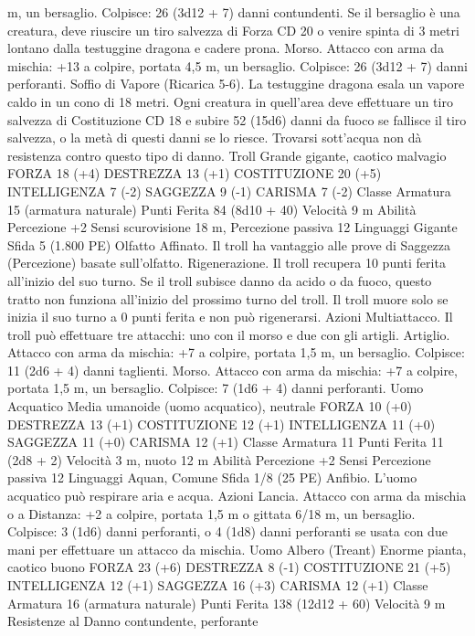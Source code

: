 \begin{multicols}{2}
m, un bersaglio.
Colpisce: 26 (3d12 + 7) danni contundenti. Se il bersaglio è una
creatura, deve riuscire un tiro salvezza di Forza CD 20 o venire
spinta di 3 metri lontano dalla testuggine dragona e cadere prona.
Morso. Attacco con arma da mischia: +13 a colpire, portata 4,5
m, un bersaglio.
Colpisce: 26 (3d12 + 7) danni perforanti.
Soffio di Vapore (Ricarica 5-6). La testuggine dragona esala un
vapore caldo in un cono di 18 metri. Ogni creatura in quell’area
deve effettuare un tiro salvezza di Costituzione CD 18 e subire
52 (15d6) danni da fuoco se fallisce il tiro salvezza, o la metà di
questi danni se lo riesce. Trovarsi sott’acqua non dà resistenza
contro questo tipo di danno.
Troll
Grande gigante, caotico malvagio
FORZA 18 (+4)
DESTREZZA 13 (+1)
COSTITUZIONE 20 (+5)
INTELLIGENZA 7 (-2)
SAGGEZZA 9 (-1)
CARISMA 7 (-2)
Classe Armatura 15 (armatura naturale)
Punti Ferita 84 (8d10 + 40)
Velocità 9 m
Abilità Percezione +2
Sensi scurovisione 18 m, Percezione passiva 12
Linguaggi Gigante
Sfida 5 (1.800 PE)
Olfatto Affinato. Il troll ha vantaggio alle prove di Saggezza
(Percezione) basate sull’olfatto.
Rigenerazione. Il troll recupera 10 punti ferita all’inizio del suo
turno. Se il troll subisce danno da acido o da fuoco, questo tratto
non funziona all’inizio del prossimo turno del troll. Il troll muore
solo se inizia il suo turno a 0 punti ferita e non può rigenerarsi.
Azioni
Multiattacco. Il troll può effettuare tre attacchi: uno con il morso
e due con gli artigli.
Artiglio. Attacco con arma da mischia: +7 a colpire, portata 1,5
m, un bersaglio.
Colpisce: 11 (2d6 + 4) danni taglienti.
Morso. Attacco con arma da mischia: +7 a colpire, portata 1,5
m, un bersaglio.
Colpisce: 7 (1d6 + 4) danni perforanti.
Uomo Acquatico
Media umanoide (uomo acquatico), neutrale
FORZA 10 (+0)
DESTREZZA 13 (+1)
COSTITUZIONE 12 (+1)
INTELLIGENZA 11 (+0)
SAGGEZZA 11 (+0)
CARISMA 12 (+1)
Classe Armatura 11
Punti Ferita 11 (2d8 + 2)
Velocità 3 m, nuoto 12 m
Abilità Percezione +2
Sensi Percezione passiva 12
Linguaggi Aquan, Comune
Sfida 1/8 (25 PE)
Anfibio. L’uomo acquatico può respirare aria e acqua.
Azioni
Lancia. Attacco con arma da mischia o a Distanza: +2 a colpire,
portata 1,5 m o gittata 6/18 m, un bersaglio.
Colpisce: 3 (1d6) danni perforanti, o 4 (1d8) danni perforanti se
usata con due mani per effettuare un attacco da mischia.
Uomo Albero (Treant)
Enorme pianta, caotico buono
FORZA 23 (+6)
DESTREZZA 8 (-1)
COSTITUZIONE 21 (+5)
INTELLIGENZA 12 (+1)
SAGGEZZA 16 (+3)
CARISMA 12 (+1)
Classe Armatura 16 (armatura naturale)
Punti Ferita 138 (12d12 + 60)
Velocità 9 m
Resistenze al Danno contundente, perforante

\end{multicols}
